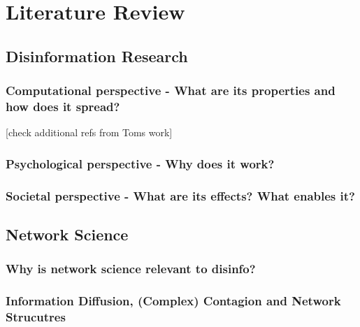 \section{Literature Review}

\begin{comment}
this is a comments
\end{comment}

\subsection{Disinformation Research}


\subsubsection{Computational perspective - What are its properties and how does it spread?}
[check additional refs from Toms work]


\subsubsection{Psychological perspective - Why does it work?}

\subsubsection{Societal perspective - What are its effects? What enables it?}




\subsection{Network Science}
\subsubsection{Why is network science relevant to disinfo?}
\subsubsection{Information Diffusion, (Complex) Contagion and Network Strucutres}
